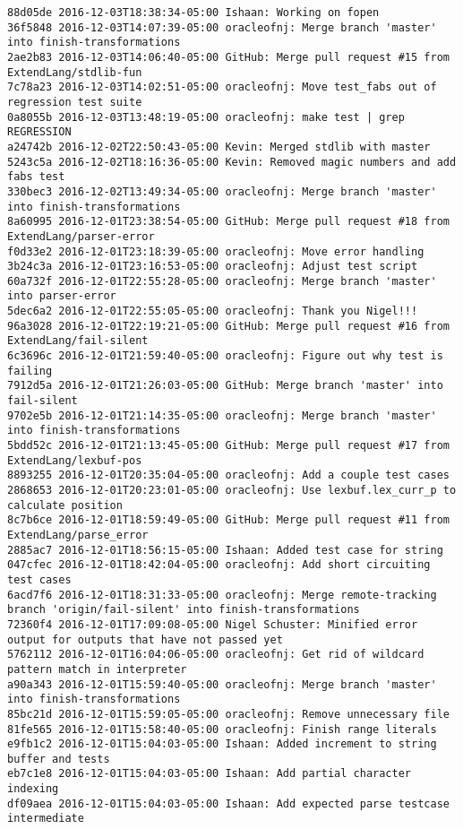 \begin{lstlisting}
88d05de 2016-12-03T18:38:34-05:00 Ishaan: Working on fopen
36f5848 2016-12-03T14:07:39-05:00 oracleofnj: Merge branch 'master' into finish-transformations
2ae2b83 2016-12-03T14:06:40-05:00 GitHub: Merge pull request #15 from ExtendLang/stdlib-fun
7c78a23 2016-12-03T14:02:51-05:00 oracleofnj: Move test_fabs out of regression test suite
0a8055b 2016-12-03T13:48:19-05:00 oracleofnj: make test | grep REGRESSION
a24742b 2016-12-02T22:50:43-05:00 Kevin: Merged stdlib with master
5243c5a 2016-12-02T18:16:36-05:00 Kevin: Removed magic numbers and add fabs test
330bec3 2016-12-02T13:49:34-05:00 oracleofnj: Merge branch 'master' into finish-transformations
8a60995 2016-12-01T23:38:54-05:00 GitHub: Merge pull request #18 from ExtendLang/parser-error
f0d33e2 2016-12-01T23:18:39-05:00 oracleofnj: Move error handling
3b24c3a 2016-12-01T23:16:53-05:00 oracleofnj: Adjust test script
60a732f 2016-12-01T22:55:28-05:00 oracleofnj: Merge branch 'master' into parser-error
5dec6a2 2016-12-01T22:55:05-05:00 oracleofnj: Thank you Nigel!!!
96a3028 2016-12-01T22:19:21-05:00 GitHub: Merge pull request #16 from ExtendLang/fail-silent
6c3696c 2016-12-01T21:59:40-05:00 oracleofnj: Figure out why test is failing
7912d5a 2016-12-01T21:26:03-05:00 GitHub: Merge branch 'master' into fail-silent
9702e5b 2016-12-01T21:14:35-05:00 oracleofnj: Merge branch 'master' into finish-transformations
5bdd52c 2016-12-01T21:13:45-05:00 GitHub: Merge pull request #17 from ExtendLang/lexbuf-pos
8893255 2016-12-01T20:35:04-05:00 oracleofnj: Add a couple test cases
2868653 2016-12-01T20:23:01-05:00 oracleofnj: Use lexbuf.lex_curr_p to calculate position
8c7b6ce 2016-12-01T18:59:49-05:00 GitHub: Merge pull request #11 from ExtendLang/parse_error
2885ac7 2016-12-01T18:56:15-05:00 Ishaan: Added test case for string
047cfec 2016-12-01T18:42:04-05:00 oracleofnj: Add short circuiting test cases
6acd7f6 2016-12-01T18:31:33-05:00 oracleofnj: Merge remote-tracking branch 'origin/fail-silent' into finish-transformations
72360f4 2016-12-01T17:09:08-05:00 Nigel Schuster: Minified error output for outputs that have not passed yet
5762112 2016-12-01T16:04:06-05:00 oracleofnj: Get rid of wildcard pattern match in interpreter
a90a343 2016-12-01T15:59:40-05:00 oracleofnj: Merge branch 'master' into finish-transformations
85bc21d 2016-12-01T15:59:05-05:00 oracleofnj: Remove unnecessary file
81fe565 2016-12-01T15:58:40-05:00 oracleofnj: Finish range literals
e9fb1c2 2016-12-01T15:04:03-05:00 Ishaan: Added increment to string buffer and tests
eb7c1e8 2016-12-01T15:04:03-05:00 Ishaan: Add partial character indexing
df09aea 2016-12-01T15:04:03-05:00 Ishaan: Add expected parse testcase intermediate

\end{lstlisting}
